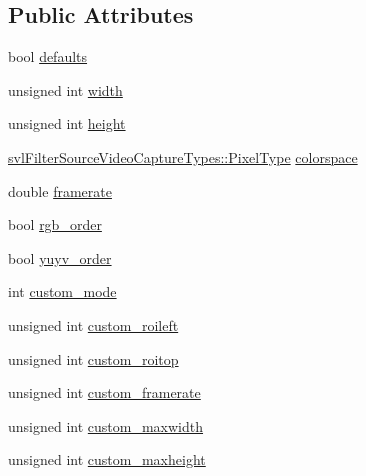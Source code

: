 \subsection*{Public Attributes}
\begin{DoxyCompactItemize}
\item 
bool \hyperlink{classsvl_filter_source_video_capture_types_1_1_image_format_a7c3d1c2c1fdfa3eb84d5e175bb62540f}{defaults}
\item 
unsigned int \hyperlink{classsvl_filter_source_video_capture_types_1_1_image_format_a240891b8edeff025cfc146a8bf0f10c8}{width}
\item 
unsigned int \hyperlink{classsvl_filter_source_video_capture_types_1_1_image_format_abb7d4da368b6bd7aea523163bece5d56}{height}
\item 
\hyperlink{namespacesvl_filter_source_video_capture_types_a6b2f5fb1010bb41e1fb7232f88fc515f}{svl\+Filter\+Source\+Video\+Capture\+Types\+::\+Pixel\+Type} \hyperlink{classsvl_filter_source_video_capture_types_1_1_image_format_a22a7b205fee2bf868890165f55c9b098}{colorspace}
\item 
double \hyperlink{classsvl_filter_source_video_capture_types_1_1_image_format_a1d13e39b8f47f5505b1aebeea7dfbbf4}{framerate}
\item 
bool \hyperlink{classsvl_filter_source_video_capture_types_1_1_image_format_a2fc3d0ae433e5def9e7f24d653ae8b47}{rgb\+\_\+order}
\item 
bool \hyperlink{classsvl_filter_source_video_capture_types_1_1_image_format_a7cbd79938ec75e77ea6cb6d8b0d414a0}{yuyv\+\_\+order}
\item 
int \hyperlink{classsvl_filter_source_video_capture_types_1_1_image_format_ab7168d8a514625e6d284515b6ce5260e}{custom\+\_\+mode}
\item 
unsigned int \hyperlink{classsvl_filter_source_video_capture_types_1_1_image_format_aa25b5c1bc445a3e4acfeb6b011914dc6}{custom\+\_\+roileft}
\item 
unsigned int \hyperlink{classsvl_filter_source_video_capture_types_1_1_image_format_acbbfb2564be79e788caff9b05119f725}{custom\+\_\+roitop}
\item 
unsigned int \hyperlink{classsvl_filter_source_video_capture_types_1_1_image_format_a596ab75ce0db32080b998848a16ff1b2}{custom\+\_\+framerate}
\item 
unsigned int \hyperlink{classsvl_filter_source_video_capture_types_1_1_image_format_ac9f69e49b8131198d899837d6905ad42}{custom\+\_\+maxwidth}
\item 
unsigned int \hyperlink{classsvl_filter_source_video_capture_types_1_1_image_format_aa23473103487ad59d5efc9b353b28f41}{custom\+\_\+maxheight}

\end{DoxyCompactItemize}
